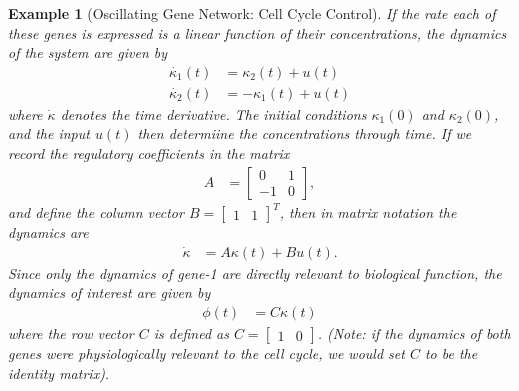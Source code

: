 \documentclass{article}
\newcommand{\1}{\mathbbm{1}}
\newtheorem{example}{Example}
\begin{document}
\begin{example}[Oscillating Gene Network: Cell Cycle Control]
    If the rate each of these genes is expressed is a linear function of their concentrations, the dynamics of the system are given by
    \begin{align*}
      \dot{\kappa_{1}}(t) &= \kappa_{2}(t) + u(t) \\
      \dot{\kappa_{2}}(t) &= - \kappa_{1}(t) + u(t)
    \end{align*}
    where $\dot{\kappa}$ denotes the time derivative. The initial conditions $\kappa_{1}(0)$ and $\kappa_{2}(0)$, and the input $u(t)$ then determiine the concentrations through time. If we record the regulatory coefficients in the matrix
    \begin{align*}
      A &= \begin{bmatrix} 0 & 1 \\ -1 & 0 \end{bmatrix} ,
    \end{align*}
    and define the column vector $B = \begin{bmatrix} 1 & 1 \end{bmatrix}^{T}$, then in matrix notation the dynamics are
      \begin{align*}
      \dot{\kappa} &= A \kappa(t) + B u(t) .
      \end{align*}
      Since only the dynamics of gene-1 are directly relevant to biological function, the dynamics of interest are given by
      \begin{align*}
      \phi(t) &= C \kappa (t)
      \end{align*}
      where the row vector $C$ is defined as $C = \begin{bmatrix} 1 & 0 \end{bmatrix}$. (Note: if the dynamics of both genes were physiologically relevant to the cell cycle, we would set $C$ to be the identity matrix).

\end{example}
\end{document}
